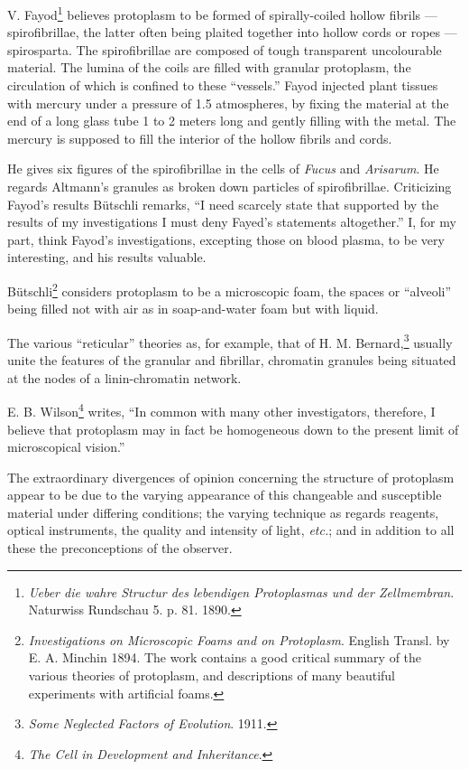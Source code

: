 \documentclass[a4paper, 12pt, oneside, landscape]{article}
\begin{document}
V. Fayod\footnote{\emph{Ueber die wahre Structur des lebendigen Protoplasmas und der Zellmembran}. Naturwiss Rundschau 5. p. 81. 1890.} believes protoplasm to be formed of spirally-coiled hollow fibrils --- spirofibrillae, the latter often being plaited together into hollow cords or ropes --- spirosparta. The spirofibrillae are composed of tough transparent uncolourable material. The lumina of the coils are filled with granular protoplasm, the circulation of which is confined to these ``vessels.'' Fayod injected plant tissues with mercury under a pressure of 1.5 atmospheres, by fixing the material at the end of a long glass tube 1 to 2 meters long and gently filling with the metal. The mercury is supposed to fill the interior of the hollow fibrils and cords.

He gives six figures of the spirofibrillae in the cells of \emph{Fucus} and \emph{Arisarum}. He regards Altmann's granules as broken down particles of spirofibrillae. Criticizing Fayod's results Bütschli remarks, ``I need scarcely state that supported by the results of my investigations I must deny Fayed's statements altogether.'' I, for my part, think Fayod's investigations, excepting those on blood plasma, to be very interesting, and his results valuable.

Bütschli\footnote{\emph{Investigations on Microscopic Foams and on Protoplasm}. English Transl. by E. A. Minchin 1894. The work contains a good critical summary of the various theories of protoplasm, and descriptions of many beautiful experiments with artificial foams.} considers protoplasm to be a microscopic foam, the spaces or ``alveoli'' being filled not with air as in soap-and-water foam but with liquid.

The various ``reticular'' theories as, for example, that of H. M. Bernard,\footnote{\emph{Some Neglected Factors of Evolution}. 1911.} usually unite the features of the granular and fibrillar, chromatin granules being situated at the nodes of a linin-chromatin network.

E. B. Wilson\footnote{\emph{The Cell in Development and Inheritance}.} writes, ``In common with many other investigators, therefore, I believe that protoplasm may in fact be homogeneous down to the present limit of microscopical vision.''

The extraordinary divergences of opinion concerning the structure of protoplasm appear to be due to the varying appearance of this changeable and susceptible material under differing conditions; the varying technique as regards reagents, optical instruments, the quality and intensity of light, \emph{etc.}; and in addition to all these the preconceptions of the observer.
\end{document}
